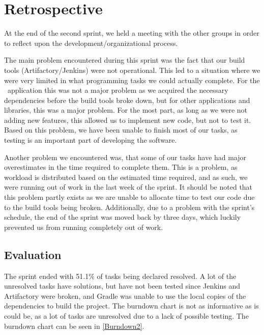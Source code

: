 \section{Retrospective}\label{S2Retro}
At the end of the second sprint, we held a meeting with the other groups in
order to reflect upon the development/organizational process.\nl

The main problem encountered during this sprint was the fact that our build
tools (Artifactory/Jenkins) were not operational. This led to a
situation where we were very limited in what programming tasks we could actually
complete. For the \lapp\ application this was not a major problem as we
acquired the necessary dependencies before the build tools broke down, but for
other applications and libraries, this was a major problem. For the most part,
as long as we were not adding new features, this allowed us to implement new
code, but not to test it. Based on this problem, we have been unable to finish
most of our tasks, as testing is an important part of developing the
software.\nl

Another problem we encountered was, that some of our tasks have had major
overestimates in the time required to complete them. This is a problem, as
workload is distributed based on the estimated time required, and as such, we
were running out of work in the last week of the sprint. It should be noted that
this problem partly exists as we are unable to allocate time to test our code
due to the build tools being broken. Additionally, due to a problem with the
sprint's schedule, the end of the sprint was moved back by three days, which
luckily prevented us from running completely out of work.

\subsection{Evaluation}
The sprint ended with 51.1\% of tasks being declared resolved. A lot of the
unresolved tasks have solutions, but have not been tested since Jenkins and
Artifactory were broken, and Gradle was unable to use the local copies of the
dependencies to build the project. The burndown chart is not as informative as
is could be, as a lot of tasks are unresolved due to a lack of possible testing.
The burndown chart can be seen in \autoref{Burndown2}.






